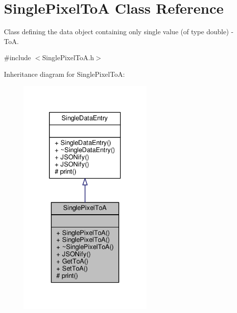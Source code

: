 \hypertarget{classSinglePixelToA}{\section{Single\+Pixel\+To\+A Class Reference}
\label{classSinglePixelToA}
}


Class defining the data object containing only single value (of type double) -\/ To\+A.  




{\ttfamily \#include $<$Single\+Pixel\+To\+A.\+h$>$}



Inheritance diagram for Single\+Pixel\+To\+A\+:\nopagebreak
\begin{figure}[H]
\begin{center}
\leavevmode
\includegraphics[width=189pt]{classSinglePixelToA__inherit__graph}
\end{center}
\end{figure}



